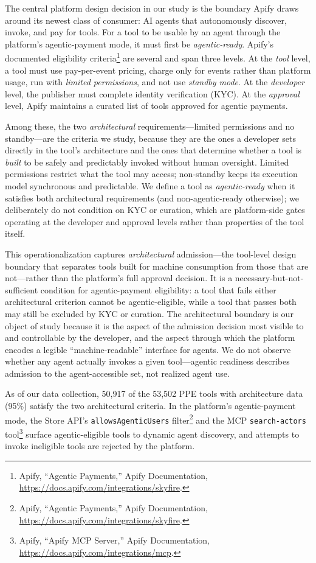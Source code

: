 The central platform design decision in our study is the boundary Apify draws
around its newest class of consumer: AI agents that autonomously discover,
invoke, and pay for tools. For a tool to be usable by an agent through the
platform's agentic-payment mode, it must first be \emph{agentic-ready}.
Apify's documented eligibility criteria\footnote{Apify, ``Agentic Payments,''
Apify Documentation, \url{https://docs.apify.com/integrations/skyfire}.} are
several and span three levels. At the \emph{tool} level, a tool must use
pay-per-event pricing, charge only for events rather than platform usage, run
with \emph{limited permissions}, and not use \emph{standby mode}. At the
\emph{developer} level, the publisher must complete identity verification
(KYC). At the \emph{approval} level, Apify maintains a curated list of tools
approved for agentic payments.

Among these, the two \emph{architectural} requirements---limited permissions
and no standby---are the criteria we study, because they are the ones a
developer sets directly in the tool's architecture and the ones that determine
whether a tool is \emph{built} to be safely and predictably invoked without
human oversight. Limited permissions restrict what the tool may access;
non-standby keeps its execution model synchronous and predictable. We define a
tool as \emph{agentic-ready} when it satisfies both architectural requirements
(and non-agentic-ready otherwise); we deliberately do not condition on KYC or
curation, which are platform-side gates operating at the developer and
approval levels rather than properties of the tool itself.

This operationalization captures \emph{architectural} admission---the tool-level
design boundary that separates tools built for machine consumption from those
that are not---rather than the platform's full approval decision. It is a
necessary-but-not-sufficient condition for agentic-payment eligibility: a tool
that fails either architectural criterion cannot be agentic-eligible, while a
tool that passes both may still be excluded by KYC or curation. The
architectural boundary is our object of study because it is the aspect of the
admission decision most visible to and controllable by the developer, and the
aspect through which the platform encodes a legible ``machine-readable''
interface for agents. We do not observe whether any agent actually invokes a
given tool---agentic readiness describes admission to the agent-accessible
set, not realized agent use.

As of our data collection, 50{,}917 of the 53{,}502 PPE tools with architecture
data (95\%) satisfy the two architectural criteria. In the platform's
agentic-payment mode, the Store API's \texttt{allowsAgenticUsers}
filter\footnote{Apify, ``Agentic Payments,'' Apify Documentation,
\url{https://docs.apify.com/integrations/skyfire}.} and the MCP
\texttt{search-actors} tool\footnote{Apify, ``Apify MCP Server,'' Apify
Documentation, \url{https://docs.apify.com/integrations/mcp}.} surface
agentic-eligible tools to dynamic agent discovery, and attempts to invoke
ineligible tools are rejected by the platform.

